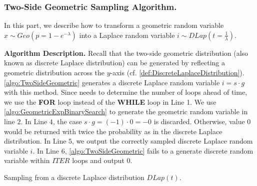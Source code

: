 \subsubsection{Two-Side Geometric Sampling Algorithm.}
\label{subsubsec:TwoSideGeometricSamplingAlgorithm}
In this part, we describe how to transform a geometric random variable $x \sim Geo\left(p=1-e^{-\lambda}\right) $ into a Laplace random variable $i\sim DLap\left(t=\frac{1}{\lambda}\right) $.

\textbf{Algorithm Description.}
Recall that the two-side geometric distribution (also known as discrete Laplace distribution) can be generated by reflecting a geometric distribution across the $y$-axis (cf. \autoref{def:DiscreteLaplaceDistribution}).
\autoref{algo:TwoSideGeometric} generates a discrete Laplace random variable $i=s\cdot g$ with this method. Since \smpc needs to determine the number of loops ahead of time, we use the \textbf{FOR} loop instead of the \textbf{WHILE} loop in Line 1.
We use \autoref{algo:GeometricExpBinarySearch} to generate the geometric random variable in line $2$.
In Line $4$, the case $s\cdot g =\left(-1\right)\cdot 0 =-0$ is discarded. Otherwise, value $0$ would be returned with twice the probability as in the discrete Laplace distribution.
In Line $5$, we output the correctly sampled discrete Laplace random variable $i$.
In Line $6$, \autoref{algo:TwoSideGeometric} fails to a generate discrete random variable within $ITER$ loops and output $0$.

\begin{algorithm}[tbh!]
    \centering
    \caption{Sampling from a discrete Laplace distribution $ DLap\left(t\right) $.}
    \label{algo:TwoSideGeometric}
\end{algorithm}
\FloatBarrier

